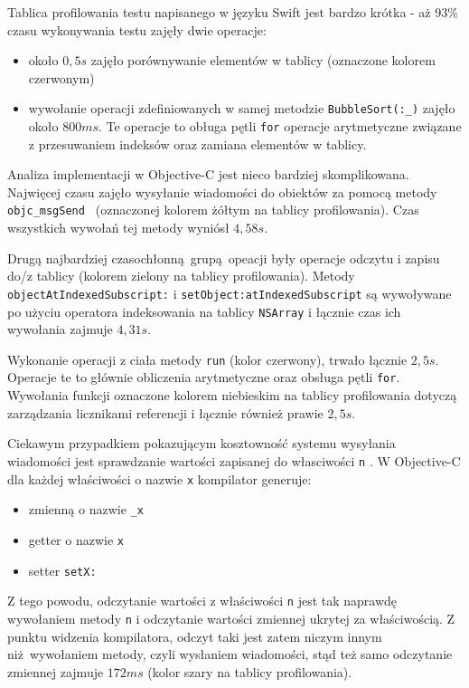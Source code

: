 \documentclass[mgr, shortabstract]{iithesis}
\newcommand{\swiftinline}[1]{
    \texttt{#1}
}
\newcommand{\objcinline}[1]{
    \texttt{#1}
}
\begin{document}
Tablica profilowania testu napisanego w języku Swift jest bardzo krótka - aż 93\% czasu wykonywania testu zajęły dwie operacje:

\begin{itemize}
    \item około $0,5s$ zajęło porównywanie elementów w tablicy (oznaczone kolorem czerwonym)
    \item wywołanie operacji zdefiniowanych w samej metodzie \swiftinline{BubbleSort(:_)} zajęło około $800 ms$. Te operacje to obługa pętli \texttt{for} operacje arytmetyczne związane z przesuwaniem indeksów oraz zamiana elementów w tablicy.
\end{itemize}

Analiza implementacji w Objective-C jest nieco bardziej skomplikowana. Najwięcej czasu zajęło wysyłanie wiadomości do obiektów za pomocą metody \objcinline{objc_msgSend } (oznaczonej kolorem żółtym na tablicy profilowania). Czas wszystkich wywołań tej metody wyniósł $4,58s$.

Drugą najbardziej czasochłonną grupą opeacji były operacje odczytu i zapisu do/z tablicy (kolorem zielony na tablicy profilowania). Metody \objcinline{objectAtIndexedSubscript:} i \objcinline{setObject:atIndexedSubscript} są wywoływane po użyciu operatora indeksowania na tablicy \objcinline{NSArray} i łącznie czas ich wywołania zajmuje $4,31s$.

Wykonanie operacji z ciała metody \objcinline{run} (kolor czerwony), trwało łącznie $2,5s$. Operacje te to głównie obliczenia arytmetyczne oraz obsługa pętli \texttt{for}. Wywołania funkcji oznaczone kolorem niebieskim na tablicy profilowania dotyczą zarządzania licznikami referencji i łącznie również prawie $2,5s$.

Ciekawym przypadkiem pokazującym kosztowność systemu wysyłania wiadomości jest sprawdzanie wartości zapisanej do własciwości \objcinline{n}. W Objective-C dla każdej właściwości o nazwie \objcinline{x} kompilator generuje:

\begin{itemize}
    \item zmienną o nazwie \objcinline{_x}
    \item getter o nazwie \objcinline{x}
    \item setter \objcinline{setX:}
\end{itemize}

Z tego powodu, odczytanie wartości z właściwości  \objcinline{n} jest tak naprawdę wywołaniem metody \objcinline{n} i odczytanie wartości zmiennej ukrytej za właściwością. Z punktu widzenia kompilatora, odczyt taki jest zatem niczym innym niż wywołaniem metody, czyli wysłaniem wiadomości, stąd też samo odczytanie zmiennej zajmuje $172ms$ (kolor szary na tablicy profilowania).
\end{document}
